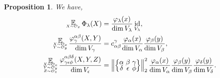 \documentclass[notitlepage, 11pt, letterpaper]{amsart}
\makeatletter
\theoremstyle{plain}
\newtheorem{prop}[thm]{Proposition}
\theoremstyle{definition}
\DeclareMathOperator{\id}{id}
\DeclareMathOperator*{\expect}{\mathbb{E}}
\newcommand{\orbit}{\mathcal O}
\newcommand{\norm}[1]{\left\lVert#1\right\rVert}
\newcommand{\vp}{\varphi} %
\newcommand{\ex}{x}
\newcommand{\ey}{y}
\newcommand{\ez}{z}
\newcommand{\ya}{\alpha}
\newcommand{\yb}{\beta}
\newcommand{\yc}{\gamma}
\newcommand{\yd}{\delta}
\newcommand{\ye}{\epsilon}
\newcommand{\yf}{\phi}
\newcommand{\yx}{\lambda}
\newcommand{\tightcurlysixj}[1]{
\begingroup
\arraycolsep=1.5pt
\renewcommand{\arraystretch}{0.3}
\left\{\!\begin{array}{ccc}
    #1
\end{array}\!\right\}
\endgroup
}
\newcommand{\abcdefsymbol}{\tightcurlysixj{\alpha & \beta & \gamma \\ \delta & \epsilon & \phi}}
\newcommand{\tightsinglesubstack}[2]{
\begingroup
    \renewcommand{\arraystretch}{0.3}
    \begin{array}{c@{}} #1 \\ {\scriptscriptstyle #2} \end{array}
\endgroup
}
\newcommand{\tightdoublesubstack}[3]{
\begingroup
    \renewcommand{\arraystretch}{0.3}
    \begin{array}{c@{}} #1 \\ {\scriptscriptstyle #2} \\ {\scriptscriptstyle #3} \end{array}
\endgroup
}
\newcommand{\tighttriplesubstack}[4]{
\begingroup
    \renewcommand{\arraystretch}{0.3}
    \begin{array}{c@{}} #1 \\ {\scriptscriptstyle #2} \\ {\scriptscriptstyle #3} \\ {\scriptscriptstyle #4} \end{array}
\endgroup
}
\makeatother
\begin{document}
\begin{prop}
    \label{prop:random_matrices}
    We have,
    \begin{align}
        \begin{split}
            \tightsinglesubstack{\expect}{X \sim \orbit_{\ex}}\, \Phi_\yx(X)
            &= \frac{\vp_\yx(x)}{\dim V_\yx}  \id_{V_\yx}, \\
            \tightdoublesubstack{\expect}{X \sim \orbit_{\ex}}{Y \sim \orbit_{\ey}}\,  \frac{\vp^{\ya \yb}_\yc(X, Y)}{\dim V_\yc}
            &= c_{\ya \yb}^\yc \frac{\vp_\ya(x)}{\dim V_\ya}\frac{\vp_\yb(y)}{\dim V_\yb}, \\
            \tighttriplesubstack{\expect}{X \sim \orbit_{\ex}}{Y \sim \orbit_{\ey}}{Z \sim \orbit_{\ez}}\, \frac{\vp^{\ya \yb \yd}_{\yc \ye \yf}(X, Y, Z)}{\dim V_\ye}
            &= \norm{\abcdefsymbol}_2^2 \frac{\vp_\ya(x)}{\dim V_\ya}\frac{\vp_\yb(y)}{\dim V_\yb}
            \frac{\vp_\yd(y)}{\dim V_\yd}.
        \end{split}
    \end{align}
\end{prop}
\end{document}
